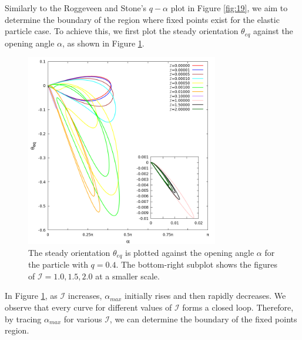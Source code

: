 \documentclass[12pt,MSc,twoside]{muthesis_2020}
\begin{document}
 Similarly to the Roggeveen and Stone's $q-\alpha$ plot in Figure \ref{fig:19}, we aim to determine the boundary of the region where fixed points exist for the elastic particle case. To achieve this, we first plot the  steady orientation $\theta_{eq}$ against the opening angle $\alpha$, as shown in Figure \ref{fig:13}. 
\begin{figure}[!h]
	\begin{center}
		\includegraphics[width=0.75\textwidth]{plot/elastic_beam_alpha_theta_eq_q_0.400.png}
		\caption{The steady orientation $\theta_{eq}$ is plotted against  the opening angle $\alpha$ for the particle with $q = 0.4$. The bottom-right subplot shows the figures of $\mathcal{I}=1.0, 1.5, 2.0$ at a smaller scale.}
    \label{fig:13}
	\end{center}
\end{figure}
In Figure \ref{fig:13}, as $\mathcal{I}$ increases, $\alpha_{max}$ initially rises and then rapidly decreases. We observe that every curve for different values of $\mathcal{I}$ forms a closed loop. Therefore, by tracing $\alpha_{max}$ for various $\mathcal{I}$, we can determine the boundary of the fixed points region.
\end{document}
